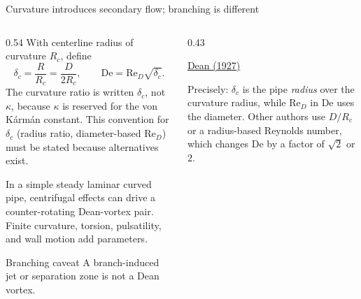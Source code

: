 \documentclass[aspectratio=169,11pt]{beamer}
\newcommand{\Rey}{\mathrm{Re}}
\newcommand{\De}{\mathrm{De}}
\begin{document}
\begin{frame}{Curvature introduces secondary flow; branching is different}
\small
\begin{columns}[T,onlytextwidth]
\begin{column}{0.54\textwidth}
With centerline radius of curvature $R_c$, define
\[
  \delta_c=\frac R{R_c}=\frac D{2R_c},
  \qquad
  \De=\Rey_D\sqrt{\delta_c}.
\]
The curvature ratio is written $\delta_c$, not $\kappa$, because $\kappa$ is reserved for the von K\'arm\'an constant. This convention for $\delta_c$ (radius ratio, diameter-based $\Rey_D$) must be stated because alternatives exist.

In a simple steady laminar curved pipe, centrifugal effects can drive a counter-rotating Dean-vortex pair. Finite curvature, torsion, pulsatility, and wall motion add parameters.

\begin{alertblock}{Branching caveat}
A branch-induced jet or separation zone is not a Dean vortex.
\end{alertblock}
\end{column}
\begin{column}{0.43\textwidth}
\centering
{}

\vspace{0.2em}
{\scriptsize \href{https://doi.org/10.1080/14786440708564324}{Dean (1927)}\par}

\vspace{0.3em}
{\scriptsize\raggedright Precisely: $\delta_c$ is the pipe \emph{radius} over the curvature radius, while $\Rey_D$ in $\De$ uses the diameter. Other authors use $D/R_c$ or a radius-based Reynolds number, which changes $\De$ by a factor of $\sqrt2$ or $2$.\par}
\end{column}
\end{columns}
\end{frame}
\end{document}
